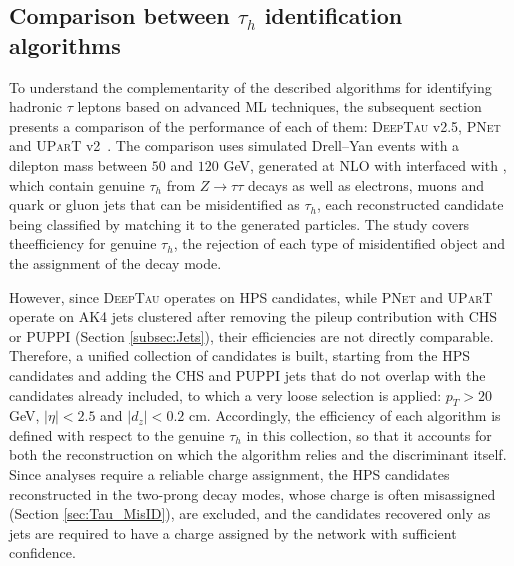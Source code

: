 \subsection{Comparison between \texorpdfstring{$\tau_h$}{τh} identification algorithms}
\label{subsec:tau_IDcomparison}
To understand the complementarity of the described algorithms for identifying hadronic $\tau$ leptons based on advanced ML techniques, the subsequent section presents a comparison of the performance of each of them: \textsc{DeepTau} v2.5, \textsc{PNet} and \textsc{UParT} v2~\cite{CMS-DP-2025-073}. The comparison uses simulated Drell--Yan events with a dilepton mass between $50$ and $120$ GeV, generated at NLO with \POWHEG{} interfaced with \PYTHIA{}, which contain genuine $\tau_h$ from $Z\to\tau\tau$ decays as well as electrons, muons and quark or gluon jets that can be misidentified as $\tau_h$, each reconstructed candidate being classified by matching it to the generated particles. The study covers theefficiency for genuine $\tau_h$, the rejection of each type of misidentified object and the assignment of the decay mode.

However, since \textsc{DeepTau} operates on HPS candidates, while \textsc{PNet} and \textsc{UParT} operate on AK4 jets clustered after removing the pileup contribution with CHS or PUPPI (Section \ref{subsec:Jets}), their efficiencies are not directly comparable. Therefore, a unified collection of candidates is built, starting from the HPS candidates and adding the CHS and PUPPI jets that do not overlap with the candidates already included, to which a very loose selection is applied: $p_T > 20$ GeV, $|\eta| < 2.5$ and $|d_z| < 0.2$ cm. Accordingly, the efficiency of each algorithm is defined with respect to the genuine $\tau_h$ in this collection, so that it accounts for both the reconstruction on which the algorithm relies and the discriminant itself. Since analyses require a reliable charge assignment, the HPS candidates reconstructed in the two-prong decay modes, whose charge is often misassigned (Section \ref{sec:Tau_MisID}), are excluded, and the candidates recovered only as jets are required to have a charge assigned by the network with sufficient confidence.



